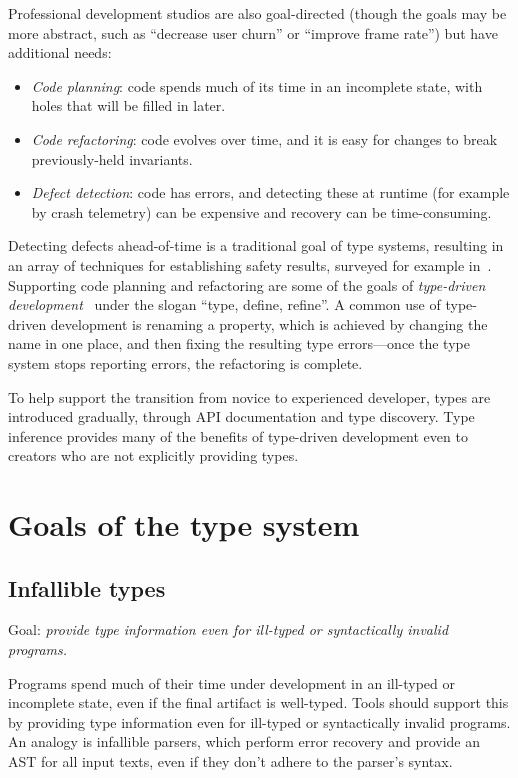 \documentclass[acmsmall]{acmart}
\begin{document}
Professional development studios are also goal-directed (though the
goals may be more abstract, such as ``decrease user churn'' or
``improve frame rate'') but have additional needs:
\begin{itemize}

\item \emph{Code planning}:
  code spends much of its time in an incomplete state, with holes
  that will be filled in later.

\item \emph{Code refactoring}:
  code evolves over time, and it is easy for changes to
  break previously-held invariants.

\item \emph{Defect detection}:
  code has errors, and detecting these at runtime (for example by crash telemetry)
  can be expensive and recovery can be time-consuming.
  
\end{itemize}
Detecting defects ahead-of-time is a traditional goal of type systems,
resulting in an array of techniques for establishing safety results,
surveyed for example in~\cite{TAPL}. Supporting code planning and
refactoring are some of the goals of \emph{type-driven
development}~\cite{TDDIdris} under the slogan ``type, define,
refine''.  A common use of type-driven development is renaming a
property, which is achieved by changing the name in one place,
and then fixing the resulting type errors---once the type system stops
reporting errors, the refactoring is complete.

To help support the transition from novice to experienced developer,
types are introduced gradually, through API documentation and type discovery.
Type inference provides many of the benefits of type-driven development
even to creators who are not explicitly providing types.

\section{Goals of the type system}
\subsection{Infallible types}

Goal: \emph{provide type information even for ill-typed or syntactically invalid programs.}

Programs spend much of their time under development in an ill-typed or incomplete state, even if the
final artifact is well-typed. Tools should support this by providing type information even for ill-typed
or syntactically invalid programs. An analogy is infallible parsers, which perform error recovery and
provide an AST for all input texts, even if they don't adhere to the parser's syntax.
\end{document}
